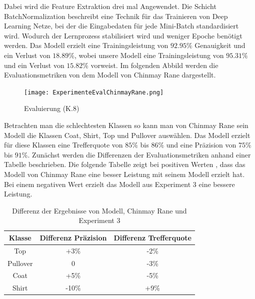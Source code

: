 \documentclass[12pt]{scrreprt}
\begin{document}
Dabei wird die Feature Extraktion drei mal Angewendet. Die Schicht BatchNormalization beschreibt eine Technik für das Trainieren von Deep Learning Netze, bei der die Eingabedaten für jede Mini-Batch standardisiert wird. Wodurch der Lernprozess stabilisiert wird und weniger Epoche benötigt werden. Das Modell erzielt eine Trainingsleistung von $92.95\%$ Genauigkeit und ein Verlust von $18.89\%$, wobei unsere Modell eine Trainingsleistung von $95.31\%$ und ein Verlust von $15.82\%$ vorweist. Im folgenden Abbild werden die Evaluationsmetriken von dem Modell von Chinmay Rane dargestellt.

\begin{figure}[h!]
	\centering
	\texttt{[image: ExperimenteEvalChinmayRane.png]}
	\caption{ Evaluierung \cite{Rane2019} (K.8)}
	\label{fig:fig50}
\end{figure}

Betrachten man die schlechtesten Klassen so kann man von Chinmay Rane sein Modell die Klassen Coat, Shirt, Top und Pullover auswählen. Das Modell erzielt für diese Klassen eine Trefferquote von $85\%$ bis $86\%$ und eine Präzision von $75\%$ bis $91\%$. Zunächst werden die Differenzen der Evaluationsmetriken anhand einer Tabelle beschrieben. Die folgende Tabelle zeigt bei positiven Werten , dass das Modell von Chinmay Rane eine besser Leistung mit seinem Modell erzielt hat. Bei einem negativen Wert erzielt das Modell aus Experiment 3 eine bessere Leistung.\\

\begin{table}[h!]
	\begin{center}
		\begin{tabular}{|c|c|c|}
			\hline
			Klasse & Differenz Präzision & Differenz Trefferquote \\
			\hline
			Top  & +3\% & -2\%\\
			\hline
			Pullover   & 0 & -3\% \\
			\hline
			Coat   & +5\% & -5\% \\
			\hline
			Shirt & -10\% & +9\% \\
			\hline
		\end{tabular}
		\caption{Differenz der Ergebnisse von Modell, Chinmay Rane und Experiment 3}
		\label{tab:differenzChinmayRane}
	\end{center}
\end{table}
\newpage
\end{document}
